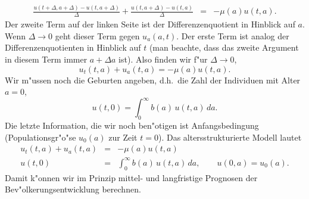 {\begin{eqnarray*}
\frac {u(t+\Delta, a+\Delta)-u(t, a+\Delta) } { \Delta }
+\frac{u(t, a+\Delta)- u(t,a)}{\Delta} & = & - \mu(a) u(t,a).
\end{eqnarray*}
Der zweite Term auf der linken Seite ist der Differenzenquotient in 
Hinblick auf $a$. Wenn $\Delta\rightarrow 0$ geht dieser Term gegen $u_a(a,t)$.
Der erste Term ist analog der Differenzenquotienten in Hinblick auf $t$ 
(man beachte, dass das zweite Argument in diesem Term immer $a+\Delta a$
ist). Also finden wir f"ur $\Delta\rightarrow 0$,
$$ u_t(t,a) + u_a(t,a) = -\mu(a) u(t,a).$$
Wir m"ussen noch die Geburten angeben, d.h.\ die Zahl der Individuen 
mit Alter $a=0$, 
$$ u(t,0) = \int_0^\infty b(a)\, u(t,a)\, da.$$
Die letzte Information, die wir noch ben"otigen ist Anfangsbedingung (Populationsgr"o"se $u_0(a)$ zur Zeit $t=0$). Das altersstrukturierte 
Modell lautet
\begin{eqnarray*}
u_t(t,a) + u_a(t,a) & = & -\mu(a) u(t,a)\\
u(t,0) & = &\int_0^\infty b(a)\, u(t,a)\, da,\qquad u(0,a)=u_0(a).
\end{eqnarray*}
Damit k"onnen wir im Prinzip mittel- und langfristige Prognosen der Bev"olkerungsentwicklung berechnen.
}

